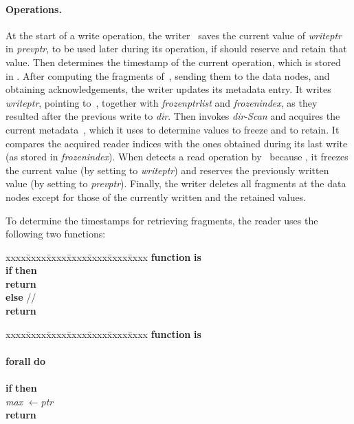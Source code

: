 \documentclass[oribibl]{llncs}
\theoremstyle{definition-boldhead}
\newcommand{\var}[1]{\textit{#1}}
\newcommand{\op}[1]{\textsl{#1}}
\newcommand{\becomes}{\ensuremath{\leftarrow}}
\newcommand{\dir}{\var{dir}\xspace}
\newcommand{\nodes}{nodes\xspace}
\begin{document}
\paragraph{Operations.}
At the start of a write operation, the writer~ saves the current
value of \var{writeptr} in \var{prevptr}, to be used later during its
operation, if  should reserve and retain that value.  Then 
determines the timestamp of the current operation, which is stored in
.  After computing the fragments of~,
sending them to the data \nodes, and obtaining  acknowledgements,
the writer updates its metadata entry.  It writes \var{writeptr},
pointing to~, together with \var{frozenptrlist} and
\var{frozenindex}, as they resulted after the previous write to \dir.  Then
 invokes \dir-\op{Scan} and acquires the current metadata~,
which it uses to determine values to freeze and to retain.  It
compares the acquired reader indices with the ones obtained during its
last write (as stored in \var{frozenindex}).  When  detects a read
operation by~ because , it freezes the current value (by setting
 to \var{writeptr})
and reserves the previously written value (by setting
 to \var{prevptr}).  Finally, the writer
deletes all fragments at the data \nodes except for those of the
currently written and the retained values.























To determine the timestamps for retrieving fragments, the reader
uses the following two functions:
\begin{minipage}{0.4\textwidth}
\begin{tabbing}\small
xxxx\=xxxx\=xxxx\=xxxx\=xxxx\=xxxx\=xxxx\kill
  \> \textbf{function}  \textbf{is} \\
  \> \> \textbf{if}  \textbf{then} \\
  \> \> \> \textbf{return}  \\
  \> \> \textbf{else} \quad //  \\
  \> \> \> \textbf{return}  \end{tabbing}
\end{minipage}
\begin{minipage}{0.4\textwidth}
\vspace{9mm}
\begin{tabbing}\small
xxxx\=xxxx\=xxxx\=xxxx\=xxxx\=xxxx\=xxxx\kill
  \> \textbf{function}  \textbf{is} \\
  \> \>  \\
  \> \> \textbf{forall}  \textbf{do} \\
  \> \> \>  \\
  \> \> \> \textbf{if} 
              \textbf{then} \\
  \> \> \> \> \var{max} \becomes \var{ptr} \\
  \> \> \textbf{return} 
\end{tabbing}
\end{minipage}
\end{document}
